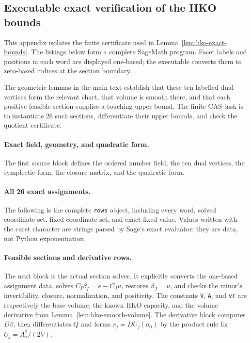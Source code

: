 \subsection{Executable exact verification of the HKO bounds}
\label{app:hko-cas}

This appendix isolates the finite certificate used in
Lemma~\ref{lem:hko-exact-bounds}. The listings below form a complete
SageMath program. Facet labels and positions in each word are
displayed one-based; the executable converts them to zero-based indices at
the section boundary.

The geometric lemmas in the main text establish that these ten labelled dual
vertices form the relevant chart, that volume is smooth there, and that each
positive feasible section supplies a touching upper bound.  The finite CAS
task is to instantiate 26 such sections, differentiate their upper bounds,
and check the quotient certificate.

\paragraph{Exact field, geometry, and quadratic form.}
The first source block defines the ordered number field, the ten dual
vertices, the symplectic form, the closure matrix, and the quadratic form.



\paragraph{All 26 exact assignments.}
The following is the complete \texttt{rows} object, including every word, solved
coordinate set, fixed coordinate set, and exact fixed value.  Values written
with the caret character are strings parsed by Sage's exact evaluator; they are data, not
Python exponentiation.



\paragraph{Feasible sections and derivative rows.}
The next block is the actual section solver.  It explicitly converts the
one-based assignment data, solves $C_I\beta_I=e-C_Ju$, restores $\beta_J=u$,
and checks the minor's invertibility, closure, normalization, and positivity.
The constants \texttt{V}, \texttt{A}, and \texttt{vr} are respectively the base
volume, the known HKO capacity, and the volume derivative from
Lemma~\ref{lem:hko-smooth-volume}. The derivative block computes $D\beta$,
then differentiates $Q$ and forms $r_j=DU_j(a_0)$ by the product rule for
$U_j=A_j^2/(2V)$.

